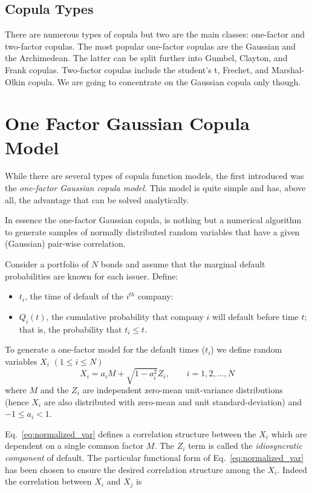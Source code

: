 \subsection{Copula Types}
There are numerous types of copula but two are the main classes: one-factor and two-factor copulas.
The most popular one-factor copulas are the Gaussian and the Archimedean. The latter can be split further into Gumbel, Clayton, and Frank copulas.
Two-factor copulas include the student’s t, Frechet, and Marshal-Olkin copula. 
We are going to concentrate on the Gaussian copula only though.

\section{One Factor Gaussian Copula Model}
While there are several types of copula function models, the first introduced was the \emph{one-factor Gaussian copula model}. This model is quite simple and has, above all, the advantage that can be solved analytically. 

In essence the one-factor Gaussian copula, is nothing but a numerical algorithm to generate samples of normally distributed random variables that have a given (Gaussian) pair-wise correlation. 

Consider a portfolio of $N$ bonds and assume that the marginal default probabilities are known for each issuer. Define:

\begin{itemize}
\tightlist
\item
$t_i$, the time of default of the $i^{th}$ company:
\item $Q_i(t)$, the cumulative probability that company $i$ will default before time $t$; that is, the probability that $t_i \le t$.
\end{itemize}

To generate a one-factor model for the default times ($t_i$) we define random variables $X_i$ $(1\le i \le N)$
\begin{equation}
X_i = a_i M + \sqrt{1-a_i^2}Z_i,\qquad i = 1, 2,\ldots, N
\label{eq:normalized_var}
\end{equation}
where $M$ and the $Z_i$ are independent zero-mean unit-variance  distributions (hence $X_i$ are also distributed with zero-mean and unit standard-deviation) and $-1 \le a_i < 1$.

Eq.~\ref{eq:normalized_var} defines a correlation structure between the $X_i$ which are dependent on a single common factor $M$. The $Z_i$ term is called the \emph{idiosyncratic component} of default. The particular functional form of Eq.~\ref{eq:normalized_var} has been chosen to ensure the desired correlation structure among the $X_i$. Indeed the correlation between $X_i$ and $X_j$ is

